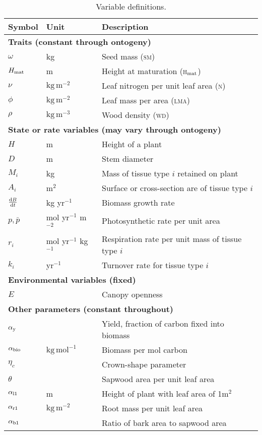 \documentclass[9pt,twcolumn]{pnas-new}
\newcommand{\lma}{\textsc{lma}}
\newcommand{\wood}{\textsc{wd}}
\newcommand{\seed}{\textsc{sm}}
\newcommand{\hmat}{\textsc{h}$_{\rm mat}$}
\newcommand{\nitrogen}{\textsc{n}}
\begin{document}
\begin{table}[!ht]
 \caption{Variable definitions.}
\centering
\begin{tabular}{p{0.5cm}p{1.75cm}p{5cm}}
\toprule
Symbol & Unit & Description \\
\midrule
\multicolumn{3}{l}{\textbf{Traits (constant through ontogeny)}}\\
$\omega$ & kg & Seed mass ({\seed})  \\
$H_{{\rm mat}}$ & m & Height at maturation ({\hmat})\\
$\nu$ & $\mathrm{kg}\,\mathrm{m}^{-2}$ & Leaf nitrogen per unit leaf area ({\nitrogen})  \\
$\phi$ & $\mathrm{kg}\,\mathrm{m}^{-2}$ & Leaf mass per area ({\lma}) \\
$\rho$ & $\mathrm{kg}\,\mathrm{m}^{-3}$ & Wood density ({\wood})\\
\multicolumn{3}{l}{\textbf{State or rate variables (may vary through ontogeny)}} \\
$H$ & m & Height of a plant\\
$D$ & m & Stem diameter\\
$M_i$ & kg & Mass of tissue type $i$ retained on plant \\
$A_i$ & m$^2$ & Surface or cross-section are of tissue type $i$\\
$\frac{{\rm d}B}{{\rm d}t}$ & kg yr$^{-1}$& Biomass growth rate\\
$p,\bar{p}$ & mol yr$^{-1}$ m$^{-2}$ & Photosynthetic rate per unit area \\
$r_i$ & mol yr$^{-1}$ kg$^{-1}$  & Respiration rate per unit mass of tissue type $i$ \\
$k_i$ & yr$^{-1}$ & Turnover rate for tissue type $i$ \\
\multicolumn{3}{l}{\textbf{Environmental variables (fixed)}} \\
$E$ & & Canopy openness\\
\multicolumn{3}{l}{\textbf{Other parameters (constant throughout)}} \\
$\alpha_{\rm y}$ &  & Yield, fraction of carbon fixed into biomass\\
$\alpha_{\rm bio}$  & $\mathrm{kg}\,\mathrm{mol}^{-1}$ & Biomass per mol carbon \\
$\eta_c$ & & Crown-shape parameter\\
$\theta$ &  & Sapwood area per unit leaf area\\
$\alpha_{\rm l1}$ & m & Height of plant with leaf area of 1m$^2$ \\
$\alpha_{\rm r1}$ & $\mathrm{kg}\,\mathrm{m}^{-2}$ & Root mass per unit leaf area \\
$\alpha_{\rm b1}$ &  & Ratio of bark area to sapwood area\\
\bottomrule
\end{tabular}

\label{tab:definitions}
\end{table}
\end{document}
